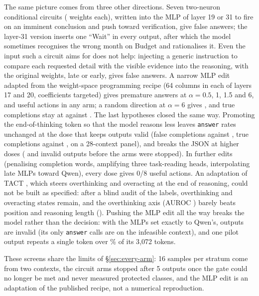 
The same picture comes from three other directions. Seven two-neuron conditional circuits (\mitTwoWeights{} weights each), written into the MLP of layer 19 or 31 to fire on an imminent conclusion and push toward verification, give \mitTwoFsp{} false answers; the layer-31 version inserts one ``Wait'' in every output, after which the model sometimes recognises the wrong month on Budget and rationalises it. %
Even the input such a circuit aims for does not help: injecting a generic instruction to compare each requested detail with the visible evidence into the reasoning, with the original weights, late or early, gives \mitTwoInj{} false answers. A narrow MLP edit adapted from the weight-space programming recipe (64 columns in each of layers 17 and 20, \ratioWeights{} coefficients targeted) gives \ratioSeries{} premature answers at $\alpha=0.5$, 1, 1.5 and 6, and \ratioUsefulAll{} useful actions in any arm; a random direction at $\alpha=6$ gives \ratioRandSix, and true completions stay at \ratioTrueRange{} against \ratioTrueOrig. %
The last hypotheses closed the same way. Promoting the end-of-thinking token so that the model reasons less leaves \texttt{answer} rates unchanged at the dose that keeps outputs valid (false completions \shortTwelveFsp{} against \shortOrigFsp, true completions \shortTwelveFsm{} against \shortOrigFsm, on a 28-context panel), and breaks the JSON at higher doses (\shortSixteenInv{} and \shortTwentyInv{} invalid outputs before the arms were stopped). In \mitOneLateN{} further edits (penalising completion words, amplifying three task-reading heads, interpolating late MLPs toward Qwen), every dose gives 0/8 useful actions. An adaptation of TACT \citep{sui2026tact}, which steers overthinking and overacting at the end of reasoning, could not be built as specified: after a blind audit of the labels, \tactOT{} overthinking and \tactOA{} overacting states remain, and the overthinking axis (AUROC \tactAuc) barely beats position and reasoning length (\tactPosLen). %
Pushing the MLP edit all the way breaks the model rather than the decision: with the MLPs set exactly to Qwen's, \attHthreefullInv{} outputs are invalid (its only \texttt{answer} calls are on the infeasible context), and one pilot output repeats a single token over \attHthreeRepeatPct\% of its 3{,}072 tokens. %

These screens share the limits of \S\ref{sec:every-arm}: 16 samples per stratum come from two contexts, the circuit arms stopped after 5 outputs once the gate could no longer be met and never measured protected classes, and the MLP edit is an adaptation of the published recipe, not a numerical reproduction. %


\FloatBarrier
